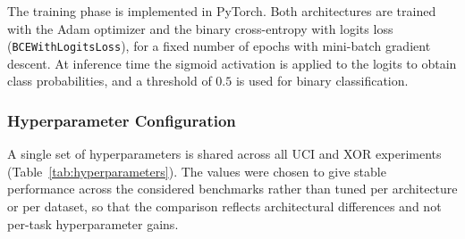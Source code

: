 \documentclass{ieeeaccess}
\begin{document}
The training phase is implemented in PyTorch. Both architectures are
trained with the Adam optimizer and the binary cross-entropy with
logits loss (\texttt{BCEWithLogitsLoss}), for a fixed number of epochs
with mini-batch gradient descent. At inference time the sigmoid
activation is applied to the logits to obtain class probabilities, and
a threshold of $0.5$ is used for binary classification.

\subsubsection{Hyperparameter Configuration}\label{sec:hyperparams}

A single set of hyperparameters is shared across all UCI and XOR
experiments (Table~\ref{tab:hyperparameters}). The values were chosen to
give stable performance across the considered benchmarks rather than
tuned per architecture or per dataset, so that the comparison reflects
architectural differences and not per-task hyperparameter gains.
\end{document}
